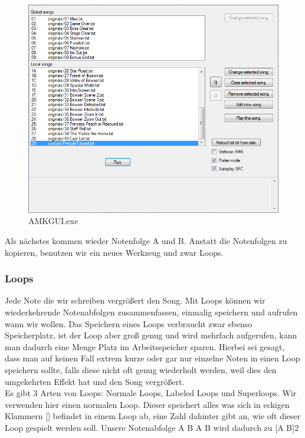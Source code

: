 \begin{figure}[htbp] \centering
	\includegraphics[width=.95\linewidth]{images/AMKGUI.png}
	\caption{AMKGUI.exe}
	\label{AMKGUI}
\end{figure}


Als nächstes kommen wieder Notenfolge A und B. Anstatt die Notenfolgen zu kopieren, benutzen wir ein neues Werkzeug und zwar Loops.

\subsubsection{Loops}
Jede Note die wir schreiben vergrößert den Song. Mit Loops können wir wiederkehrende Notenabfolgen zusammenfassen, einmalig speichern und aufrufen wann wir wollen.
Das Speichern eines Loops verbraucht zwar ebenso Speicherplatz, ist der Loop aber groß genug und wird mehrfach aufgerufen, kann man dadurch eine Menge Platz im Arbeitsspeicher sparen.
Hierbei sei gesagt, dass man auf keinen Fall extrem kurze oder gar nur einzelne Noten in einen Loop speichern sollte, falls diese nicht oft genug wiederholt werden, weil dies den umgekehrten Effekt hat und den Song vergrößert. \\
Es gibt 3 Arten von Loops: Normale Loops, Labeled Loops und Superloops. Wir verwenden hier einen normalen Loop. Dieser speichert alles was sich in eckigen Klammern [] befindet in einem Loop ab, eine Zahl dahinter gibt an, wie oft dieser Loop gespielt werden soll. Unsere Notenabfolge A B A B wird dadurch zu [A B]2




